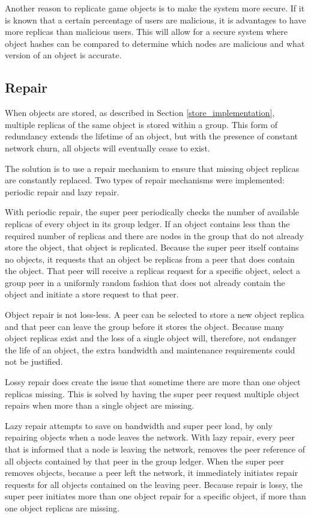Another reason to replicate game objects is to make the system more secure. If it is known that a certain percentage of users are malicious, it is advantages to have more replicas than malicious users. This will allow for a secure system where object hashes can be compared to determine which nodes are malicious and what version of an object is accurate.

\subsection{Repair}

When objects are stored, as described in Section \ref{store_implementation}, multiple replicas of the same object is stored within a group. This form of redundancy extends the lifetime of an object, but with the presence of constant network churn, all objects will eventually cease to exist.

The solution is to use a repair mechanism to ensure that missing object replicas are constantly replaced. Two types of repair mechanisms were implemented: periodic repair and lazy repair.

With periodic repair, the super peer periodically checks the number of available replicas of every object in its group ledger. If an object contains less than the required number of replicas and there are nodes in the group that do not already store the object, that object is replicated. Because the super peer itself contains no objects, it requests that an object be replicas from a peer that does contain the object. That peer will receive a replicas request for a specific object, select a group peer in a uniformly random fashion that does not already contain the object and initiate a store request to that peer.

Object repair is not loss-less. A peer can be selected to store a new object replica and that peer can leave the group before it stores the object. Because many object replicas exist and the loss of a single object will, therefore, not endanger the life of an object, the extra bandwidth and maintenance requirements could not be justified.

Lossy repair does create the issue that sometime there are more than one object replicas missing. This is solved by having the super peer request multiple object repairs when more than a single object are missing.

Lazy repair attempts to save on bandwidth and super peer load, by only repairing objects when a node leaves the network. With lazy repair, every peer that is informed that a node is leaving the network, removes the peer reference of all objects contained by that peer in the group ledger. When the super peer removes objects, because a peer left the network, it immediately initiates repair requests for all objects contained on the leaving peer. Because repair is lossy, the super peer initiates more than one object repair for a specific object, if more than one object replicas are missing.

